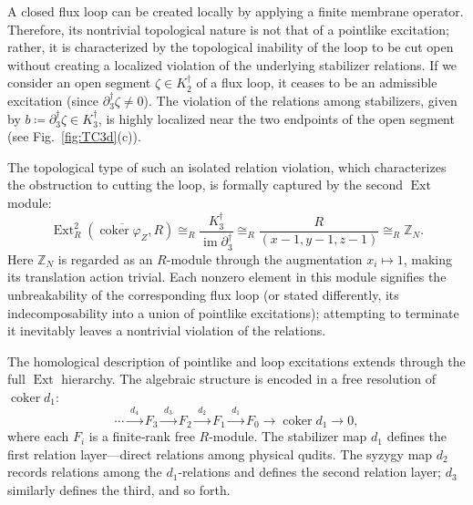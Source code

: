 \documentclass[aps,prx,english,superscriptaddress,twocolumn,tightenlines,showpacs,longbibliography,floatfix,amsfonts]{revtex4-2}
\theoremstyle{remark}
\theoremstyle{definition}
\begin{document}
A closed flux loop can be created locally by applying a finite membrane operator. Therefore, its nontrivial topological nature is not that of a pointlike excitation; rather, it is characterized by the topological inability of the loop to be cut open without creating a localized violation of the underlying stabilizer relations. If we consider an open segment $\zeta\in K_2^\dagger$ of a flux loop, it ceases to be an admissible excitation (since $\partial_3^\dagger \zeta\neq 0$). The violation of the relations among stabilizers, given by $b \coloneqq \partial_3^\dagger\zeta\in K_3^\dagger$, is highly localized near the two endpoints of the open segment (see Fig.~\ref{fig:TC3d}(c)).

The topological type of such an isolated relation violation, which characterizes the obstruction to cutting the loop, is formally captured by the second $\operatorname{Ext}$ module:
\begin{equation}
	\operatorname{Ext}_R^2(\overline{\operatorname{coker}\varphi_Z},R) \cong_R \frac{K_3^\dagger}{\operatorname{im}\partial_3^\dagger} \cong_R \frac{R}{(x-1,y-1,z-1)} \cong_R \mathbb{Z}_N.
	\label{eq:3d-loop-ext2}
\end{equation}
Here \(\mathbb Z_N\) is regarded as an \(R\)-module through the augmentation
\(x_i\mapsto1\), making its translation action trivial.
Each nonzero element in this module signifies the unbreakability of the corresponding flux loop (or stated differently, its indecomposability into a union of pointlike excitations); attempting to terminate it inevitably leaves a nontrivial violation of the relations.

The homological description of pointlike and loop excitations extends through the full $\operatorname{Ext}$ hierarchy. The algebraic structure is encoded in a free resolution of $\operatorname{coker} d_1$:
\begin{equation}
	\cdots \xrightarrow{\;d_4\;} F_3 \xrightarrow{\;d_3\;} F_2 \xrightarrow{\;d_2\;} F_1 \xrightarrow{\;d_1\;} F_0 \rightarrow \operatorname{coker} d_1 \rightarrow 0 ,
	\label{eq:full-resolution}
\end{equation}
where each $F_i$ is a finite‑rank free $R$-module. The stabilizer map $d_1$
defines the first relation layer---direct relations among physical qudits. The syzygy map $d_2$ records relations among
the $d_1$-relations and defines the second relation layer; $d_3$ similarly
defines the third, and so forth.
\end{document}
